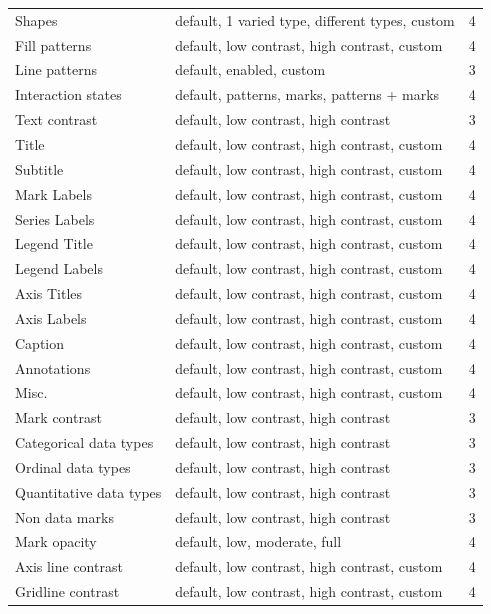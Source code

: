 \documentclass[12pt]{cmuthesis}
\begin{document}
{\begin{longtable}{@{}l p{7.2cm} r@{}}
\qquad Shapes & default, 1 varied type, different types, custom & 4 \\
\qquad Fill patterns & default, low contrast, high contrast, custom & 4 \\
\qquad Line patterns & default, enabled, custom & 3 \\
\qquad Interaction states & default, patterns, marks, patterns + marks & 4 \\
\quad Text contrast & default, low contrast, high contrast & 3 \\
\qquad Title & default, low contrast, high contrast, custom & 4 \\
\qquad Subtitle & default, low contrast, high contrast, custom & 4 \\
\qquad Mark Labels & default, low contrast, high contrast, custom & 4 \\
\qquad Series Labels & default, low contrast, high contrast, custom & 4 \\
\qquad Legend Title & default, low contrast, high contrast, custom & 4 \\
\qquad Legend Labels & default, low contrast, high contrast, custom & 4 \\
\qquad Axis Titles & default, low contrast, high contrast, custom & 4 \\
\qquad Axis Labels & default, low contrast, high contrast, custom & 4 \\
\qquad Caption & default, low contrast, high contrast, custom & 4 \\
\qquad Annotations & default, low contrast, high contrast, custom & 4 \\
\qquad Misc. & default, low contrast, high contrast, custom & 4 \\
\quad Mark contrast & default, low contrast, high contrast & 3 \\
\qquad Categorical data types & default, low contrast, high contrast & 3 \\
\qquad Ordinal data types & default, low contrast, high contrast & 3 \\
\qquad Quantitative data types & default, low contrast, high contrast & 3 \\
\qquad Non data marks & default, low contrast, high contrast & 3 \\
\quad Mark opacity & default, low, moderate, full & 4 \\
\quad Axis line contrast & default, low contrast, high contrast, custom & 4 \\
\quad Gridline contrast & default, low contrast, high contrast, custom & 4 \\

\end{longtable}}
\end{document}

